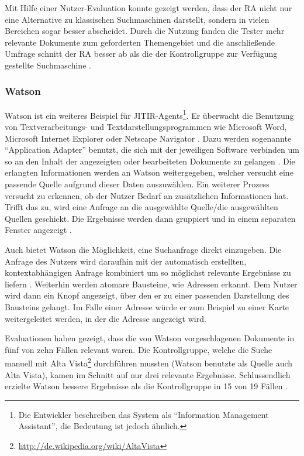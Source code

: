  	Mit Hilfe einer Nutzer-Evaluation konnte gezeigt werden, dass der RA nicht nur eine Alternative zu klassischen Suchmaschinen darstellt, sondern in vielen Bereichen sogar besser abscheidet. Durch die Nutzung fanden die Tester mehr relevante Dokumente zum geforderten Themengebiet und die anschließende Umfrage schnitt der RA besser ab als die der Kontrollgruppe zur Verfügung gestellte Suchmaschine \cite{rhodes2000just}.

 	\subsubsection{Watson}
 	Watson ist ein weiteres Beispiel für JITIR-Agents\footnote{Die Entwickler beschreiben das System als ``Information Management Assistant'', die Bedeutung ist jedoch ähnlich.}. Er überwacht die Benutzung von Textverarbeitungs- und Textdarstellungsprogrammen wie Microsoft Word, Microsoft Internet Explorer oder Netscape Navigator \cite{budzik1999watson}. Dazu werden sogenannte ``Application Adapter'' benutzt, die sich mit der jeweiligen Software verbinden um so an den Inhalt der angezeigten oder bearbeiteten Dokumente zu gelangen \cite{budzik2000user}. Die erlangten Informationen werden an Watson weitergegeben, welcher versucht eine passende Quelle aufgrund dieser Daten auszuwählen. Ein weiterer Prozess versucht zu erkennen, ob der Nutzer Bedarf an zusätzlichen Informationen hat. Trifft das zu, wird eine Anfrage an die ausgewählte Quelle/die ausgewählten Quellen geschickt. Die Ergebnisse werden dann gruppiert und in einem separaten Fenster angezeigt \cite{budzik1999watson}.

 	Auch bietet Watson die Möglichkeit, eine Suchanfrage direkt einzugeben. Die Anfrage des Nutzers wird daraufhin mit der automatisch erstellten, kontextabhängigen Anfrage kombiniert um so möglichst relevante Ergebnisse zu liefern \cite{budzik2000user}. Weiterhin werden atomare Bausteine, wie Adressen erkannt. Dem Nutzer wird dann ein Knopf angezeigt, über den er zu einer passenden Darstellung des Bausteins gelangt. Im Falle einer Adresse würde er zum Beispiel zu einer Karte weitergeleitet werden, in der die Adresse angezeigt wird.

 	Evaluationen haben gezeigt, dass die von Watson vorgeschlagenen Dokumente in fünf von zehn Fällen relevant waren. Die Kontrollgruppe, welche die Suche manuell mit Alta Vista\footnote{\url{http://de.wikipedia.org/wiki/AltaVista}} durchführen mussten (Watson benutzte als Quelle auch Alta Vista), kamen im Schnitt auf nur drei relevante Ergebnisse. Schlussendlich erzielte Watson bessere Ergebnisse als die Kontrollgruppe in 15 von 19 Fällen \cite{budzik1999watson}.

